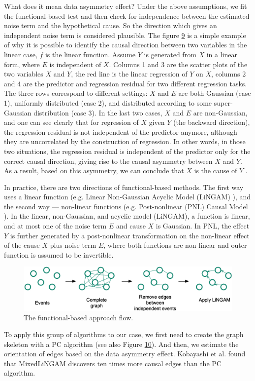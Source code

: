 What does it mean data asymmetry effect? Under the above assumptions, we fit the functional-based test and then check for independence between the estimated noise term and the hypothetical cause. So the direction which gives an independent noise term is considered plausible. The figure \hyperref[fig:fb-example]{9} is a simple example of why it is possible to identify the causal direction between two variables in the linear case, $f$ is the linear function. Assume $Y$ is generated from $X$ in a linear form, where $E$ is independent of $X$. Columns 1 and 3 are the scatter plots of the two variables $X$ and $Y$, the red line is the linear regression of $Y$ on $X$, columns 2 and 4 are the predictor and regression residual for two different regression tasks. The three rows correspond to different settings: $X$ and $E$ are both Gaussian (case 1), uniformly distributed (case 2), and distributed according to some super-Gaussian distribution (case 3). In the last two cases, $X$ and $E$ are non-Gaussian, and one can see clearly that for regression of $X$ given $Y$ (the backward direction), the regression residual is not independent of the predictor anymore, although they are uncorrelated by the construction of regression. In other words, in those two situations, the regression residual is independent of the predictor only for the correct causal direction, giving rise to the causal asymmetry between $X$ and $Y$. As a result, based on this asymmetry, we can conclude that $X$ is the cause of $Y$ \cite{glymour2019review,goudet2018learning}.\newline

In practice, there are two directions of functional-based methods. The first way uses a linear function (e.g. Linear Non-Gaussian Acyclic Model (LiNGAM) \cite{shimizu2006linear}), and the second way — non-linear functions (e.g. Post-nonlinear (PNL) Causal Model \cite{zhang2012identifiability}). In the linear, non-Gaussian, and acyclic model (LiNGAM), a function is linear, and at most one of the noise term $E$ and cause $X$ is Gaussian. In PNL, the effect $Y$ is further generated by a post-nonlinear transformation on the non-linear effect of the cause $X$ plus noise term $E$, where both functions are non-linear and outer function is assumed to be invertible.
\begin{figure}[H]
\centering
    \label{fig:fb-flow}
    \includegraphics[width=\textwidth]{figures/fb_flow.png}
    \caption{The functional-based approach flow.}
\end{figure}
To apply this group of algorithms to our case, we first need to create the graph skeleton with a PC algorithm (see also Figure \hyperref[fig:fb-flow]{10}). And then, we estimate the orientation of edges based on the data asymmetry effect. Kobayashi et al. \cite{jarry2021quantitative} found that MixedLiNGAM discovers ten times more causal edges than the PC algorithm. 

